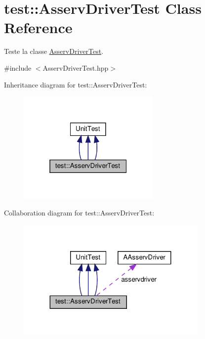 \hypertarget{classtest_1_1AsservDriverTest}{}\section{test\+:\+:Asserv\+Driver\+Test Class Reference}
\label{classtest_1_1AsservDriverTest}


Teste la classe \hyperlink{classtest_1_1AsservDriverTest}{Asserv\+Driver\+Test}.  




{\ttfamily \#include $<$Asserv\+Driver\+Test.\+hpp$>$}



Inheritance diagram for test\+:\+:Asserv\+Driver\+Test\+:
\nopagebreak
\begin{figure}[H]
\begin{center}
\leavevmode
\includegraphics[width=196pt]{classtest_1_1AsservDriverTest__inherit__graph}
\end{center}
\end{figure}


Collaboration diagram for test\+:\+:Asserv\+Driver\+Test\+:
\nopagebreak
\begin{figure}[H]
\begin{center}
\leavevmode
\includegraphics[width=263pt]{classtest_1_1AsservDriverTest__coll__graph}
\end{center}
\end{figure}
